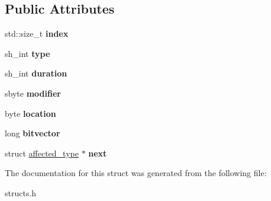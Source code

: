 \subsection*{Public Attributes}
\begin{DoxyCompactItemize}
\item 
\mbox{\label{structaffected__type_ae80868214427398c64944a0a7d795f6c}} 
std\+::size\+\_\+t {\bfseries index}
\item 
\mbox{\label{structaffected__type_a757c8e2c685afd53d5fa3e4966445db8}} 
sh\+\_\+int {\bfseries type}
\item 
\mbox{\label{structaffected__type_a7c420a9df8d72bfacb24816eac35435b}} 
sh\+\_\+int {\bfseries duration}
\item 
\mbox{\label{structaffected__type_affff66baa7cac317f9c42d37c5d5f44c}} 
sbyte {\bfseries modifier}
\item 
\mbox{\label{structaffected__type_a4a2621bf9dfe115a49de9746d395a954}} 
byte {\bfseries location}
\item 
\mbox{\label{structaffected__type_ab881bc9d714eaa7924ed374d42a9435e}} 
long {\bfseries bitvector}
\item 
\mbox{\label{structaffected__type_a749d7fa92060acc5213d9a126bf2c226}} 
struct \hyperlink{structaffected__type}{affected\+\_\+type} $\ast$ {\bfseries next}
\end{DoxyCompactItemize}


The documentation for this struct was generated from the following file\+:\begin{DoxyCompactItemize}
\item 
structs.\+h\end{DoxyCompactItemize}
